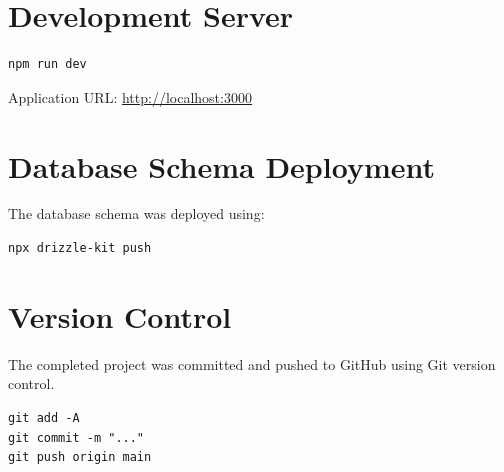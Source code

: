 \documentclass[12pt,a4paper]{report}
\begin{document}
\section{Development Server}
\begin{lstlisting}
npm run dev
\end{lstlisting}
Application URL: \url{http://localhost:3000}

\section{Database Schema Deployment}
The database schema was deployed using:
\begin{lstlisting}
npx drizzle-kit push
\end{lstlisting}

\section{Version Control}
The completed project was committed and pushed to GitHub using Git version
control.
\begin{lstlisting}
git add -A
git commit -m "..."
git push origin main
\end{lstlisting}
\end{document}
